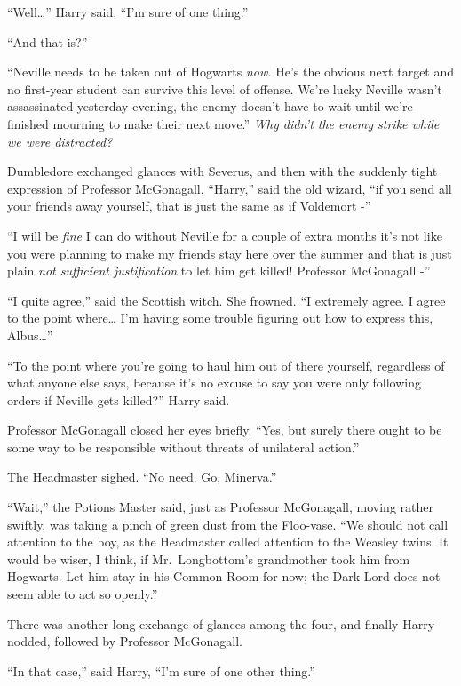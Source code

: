 ``Well\ldots{}'' Harry said. ``I'm sure of one thing.''

``And that is?''

``Neville needs to be taken out of Hogwarts \emph{now.} He's the obvious
next target and no first-year student can survive this level of offense.
We're lucky Neville wasn't assassinated yesterday evening, the enemy
doesn't have to wait until we're finished mourning to make their next
move.'' \emph{Why didn't the enemy strike while we were distracted?}

Dumbledore exchanged glances with Severus, and then with the suddenly
tight expression of Professor McGonagall. ``Harry,'' said the old
wizard, ``if you send all your friends away yourself, that is just the
same as if Voldemort -''

``I will be \emph{fine} I can do without Neville for a couple of extra
months it's not like you were planning to make my friends stay here over
the summer and that is just plain \emph{not sufficient justification} to
let him get killed! Professor McGonagall -''

``I quite agree,'' said the Scottish witch. She frowned. ``I extremely
agree. I agree to the point where\ldots{} I'm having some trouble
figuring out how to express this, Albus\ldots{}''

``To the point where you're going to haul him out of there yourself,
regardless of what anyone else says, because it's no excuse to say you
were only following orders if Neville gets killed?'' Harry said.

Professor McGonagall closed her eyes briefly. ``Yes, but surely there
ought to be some way to be responsible without threats of unilateral
action.''

The Headmaster sighed. ``No need. Go, Minerva.''

``Wait,'' the Potions Master said, just as Professor McGonagall, moving
rather swiftly, was taking a pinch of green dust from the Floo-vase.
``We should not call attention to the boy, as the Headmaster called
attention to the Weasley twins. It would be wiser, I think, if
Mr.~Longbottom's grandmother took him from Hogwarts. Let him stay in his
Common Room for now; the Dark Lord does not seem able to act so
openly.''

There was another long exchange of glances among the four, and finally
Harry nodded, followed by Professor McGonagall.

``In that case,'' said Harry, ``I'm sure of one other thing.''

